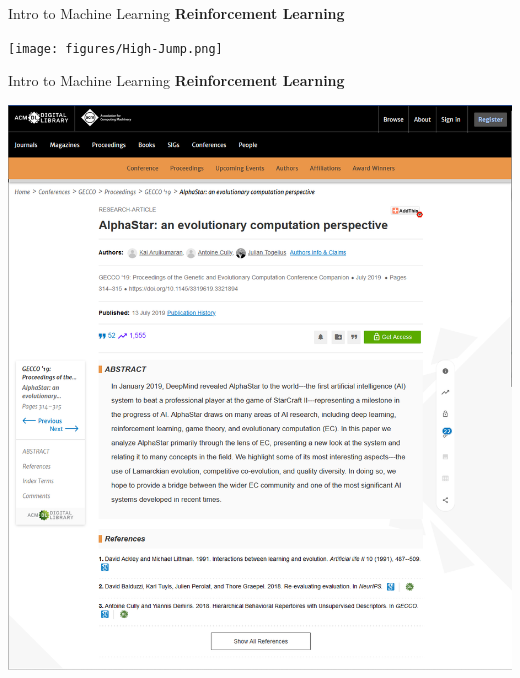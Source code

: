 \documentclass{beamer}
\begin{document}
\begin{frame}[fragile]{Intro to Machine Learning}
    \textbf{Reinforcement Learning}
    \begin{center}
        \texttt{[image: figures/High-Jump.png]}
    \end{center}
\end{frame}
\begin{frame}[fragile]{Intro to Machine Learning}
    \textbf{Reinforcement Learning}
    \begin{center}
        \includegraphics[width=\textwidth,height=0.7\textheight,keepaspectratio]{figures/AlphaStar.png}
    \end{center}
\end{frame}
\end{document}
